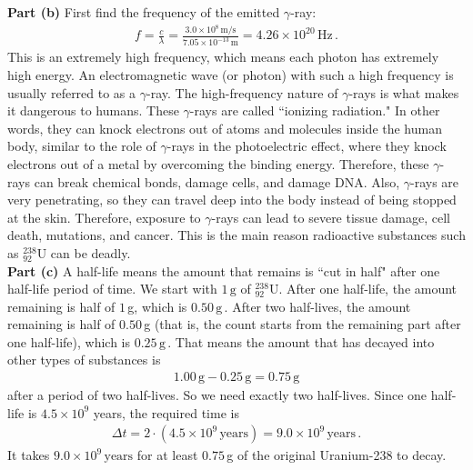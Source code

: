 \documentclass[11pt]{article}
\begin{document}
\noindent\textbf{Part (b)} First find the frequency of the emitted $\gamma$-ray:
\begin{align*}
f = \frac{c}{\lambda}
= \frac{3.0\times 10^8\,\text{m/s}}{7.05\times 10^{-13}\,\text{m}}
= 4.26\times 10^{20}\,\text{Hz}\,.
\end{align*}
This is an extremely high frequency, which means each photon has extremely high energy. An electromagnetic wave (or photon) with such a high frequency is usually referred to as a $\gamma$-ray. The high-frequency nature of $\gamma$-rays is what makes it dangerous to humans. These $\gamma$-rays are called ``ionizing radiation." In other words, they can knock electrons out of atoms and molecules inside the human body, similar to the role of $\gamma$-rays in the photoelectric effect, where they knock electrons out of a metal by overcoming the binding energy. Therefore, these $\gamma$-rays can break chemical bonds, damage cells, and damage DNA. Also, $\gamma$-rays are very penetrating, so they can travel deep into the body instead of being stopped at the skin. Therefore, exposure to $\gamma$-rays can lead to severe tissue damage, cell death, mutations, and cancer. This is the main reason radioactive substances such as $^{238}_{92}\text{U}$ can be deadly.\\

\noindent\textbf{Part (c)} A half-life means the amount that remains is ``cut in half" after one half-life period of time. We start with $
1\,\text{g}$ of $^{238}_{92}\text{U}$. After one half-life, the amount remaining is half of $1\,$g, which is $0.50\,\text{g}\,.$ After two half-lives, the amount remaining is half of $0.50\,$g (that is, the count starts from the remaining part after one half-life), which is $
0.25\,\text{g}\,.$
That means the amount that has decayed into other types of substances is
\begin{align*}
1.00\,\text{g} - 0.25\,\text{g} = 0.75\,\text{g}
\end{align*}
after a period of two half-lives. So we need exactly two half-lives. Since one half-life is $4.5\times 10^9$ years, the required time is
\begin{align*}
\Delta t = 2\cdot (4.5\times 10^9\,\text{years}) = 9.0\times 10^9\,\text{years}\,.
\end{align*}
It takes $9.0\times 10^9\,\text{years}$ for at least $0.75\,$g of the original Uranium-238 to decay.\\
\end{document}
